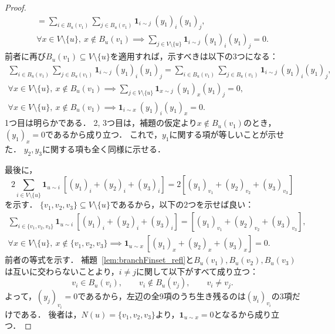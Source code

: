 \begin{proof}
\begin{gather}
    = \sum_{i \in B_u(v_1)} \sum_{j \in B_u(v_1)} \bm{1}_{i \sim j}\ (y_1)_i (y_1)_j, \\
    \forall x \in V \setminus \{u\},\ x \notin B_u(v_1) \implies \sum_{j \in V \setminus \{u\}} \bm{1}_{i \sim j}\ (y_1)_i (y_1)_j = 0.
  \end{gather}
  前者に再び$B_u(v_1) \subseteq V \setminus \{u\}$を適用すれば，示すべきは以下の3つになる：
  \begin{gather}
    \sum_{i \in B_u(v_1)} \sum_{j \in B_u(v_1)} \bm{1}_{i \sim j}\ (y_1)_i (y_1)_j
    = \sum_{i \in B_u(v_1)} \sum_{j \in B_u(v_1)} \bm{1}_{i \sim j}\ (y_1)_i (y_1)_j, \\
    \forall x \in V \setminus \{u\},\ x \notin B_u(v_1) \implies \sum_{j \in V \setminus \{u\}} \bm{1}_{x \sim j}\ (y_1)_x (y_1)_j = 0, \\
    \forall x \in V \setminus \{u\},\ x \notin B_u(v_1) \implies \bm{1}_{i \sim x}\ (y_1)_i (y_1)_x = 0.
  \end{gather}
  1つ目は明らかである．
  2, 3つ目は，補題の仮定より$x \notin B_u(v_1)$のとき，$(y_1)_x = 0$であるから成り立つ．
  これで，$y_1$に関する項が等しいことが示せた．
  $y_2, y_3$に関する項も全く同様に示せる．

  最後に，
  \begin{equation}
    2 \sum_{i \in V \setminus \{u\}} \bm{1}_{u \sim i}\ [(y_1)_i + (y_2)_i + (y_3)_i]
    = 2 [(y_1)_{v_1} + (y_2)_{v_2} + (y_3)_{v_3}]
  \end{equation}
  を示す．
  $\{v_1, v_2, v_3\} \subseteq V \setminus \{u\}$であるから，以下の2つを示せば良い：
  \begin{gather}
    \sum_{i \in \{v_1, v_2, v_3\}} \bm{1}_{u \sim i}\ [(y_1)_i + (y_2)_i + (y_3)_i]
    = [(y_1)_{v_1} + (y_2)_{v_2} + (y_3)_{v_3}], \\
    \forall x \in V \setminus \{u\},\ x \notin \{v_1, v_2, v_3\} \implies \bm{1}_{u \sim x}\ [(y_1)_x + (y_2)_x + (y_3)_x] = 0.
  \end{gather}
  前者の等式を示す．
  補題~\ref{lem:branchFinset_refl}と$B_u(v_1), B_u(v_2), B_u(v_3)$は互いに交わらないことより，$i \ne j$に関して以下がすべて成り立つ：
  \begin{equation}
    v_i \in B_u(v_i),\qquad v_i \notin B_u(v_j), \qquad v_i \ne v_j.
  \end{equation}
  よって，$(y_j)_{v_i} = 0$であるから，左辺の全9項のうち生き残るのは$(y_i)_{v_i}$の3項だけである．
  後者は，$N(u) = \{v_1, v_2, v_3\}$より，$\bm{1}_{u \sim x} = 0$となるから成り立つ．
\end{proof}

